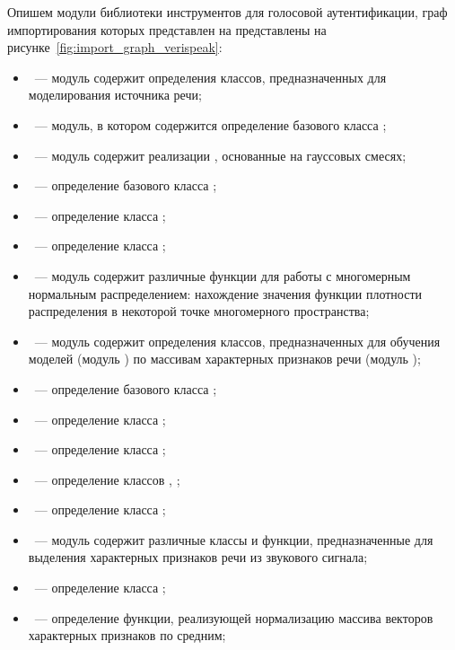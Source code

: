 Опишем модули библиотеки инструментов для голосовой аутентификации, граф
импортирования которых представлен на представлены на
рисунке~\ref{fig:import_graph_verispeak}:

\begin{itemize}
\item {}~--- модуль содержит определения классов, предназначенных для
моделирования источника речи;
\item {}~--- модуль, в котором содержится определение базового
класса ;
\item {}~--- модуль содержит реализации ,
основанные на гауссовых смесях;
\item {}~--- определение базового класса ;
\item {}~--- определение класса ;
\item {}~--- определение класса ;
\item {}~--- модуль содержит различные функции для работы с
многомерным нормальным распределением: нахождение значения функции плотности
распределения в некоторой точке многомерного пространства;
\item {}~--- модуль содержит определения классов, предназначенных
для обучения моделей (модуль ) по массивам характерных признаков
речи (модуль );
\item {}~--- определение базового класса
;
\item {}~--- определение класса ;
\item {}~--- определение класса ;
\item {}~--- определение классов ,
;
\item {}~--- определение класса
;
\item {}~--- модуль содержит различные классы и функции,
предназначенные для
выделения характерных признаков речи из звукового сигнала;
\item {}~--- определение класса
;
\item {}~--- определение функции, реализующей
нормализацию массива векторов характерных признаков по средним;

\end{itemize}
